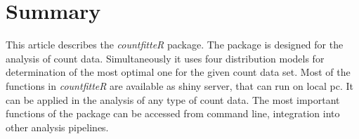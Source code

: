 


\section{Summary}

This article describes the \emph{countfitteR} package. The package is designed for the analysis of count data. Simultaneously it uses four distribution models for determination of the most optimal one for the given count data set. 
Most of the functions in \emph{countfitteR} are available as shiny server, that can run on local pc. It can be applied in the analysis of any type of count data. The most important functions of the package can be accessed from command line, integration into other analysis pipelines.



\address{Jaros\l{}aw Chilimoniuk\\
  University of Wroc\l{}aw\\
  Pl. Uniwersytecki 1, Wroc\l{}aw\\
  Poland\\
  ORCiD: 0000-0001-5467-018X\\
  }

\address{Madeleine Ruhe\\
  Brandenburg University of Technology Cottbus - Senftenberg\\
  Universit\"atsplatz 1, Senftenberg\\
  Germany\\
  ORCiD if desired\\
  }

\address{Stefan R\"{o}diger (corresponding author)\\
  Brandenburg University of Technology Cottbus - Senftenberg\\
  Universit\"atsplatz 1, Senftenberg\\
  Germany\\
  ORCiD: 0000-0002-1441-6512\\
  }

\address{Micha\l{} Burdukiewicz (corresponding author)\\
  University of Wroc\l{}aw\\
  Pl. Uniwersytecki 1, Wroc\l{}aw\\
  Poland\\
  ORCiD: 0000-0001-8926-582X\\
  }
